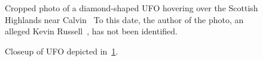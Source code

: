 %
\begin{figure}[b]
\sidecaption
%
%
\caption{Cropped photo of a diamond-shaped UFO hovering over the Scottish Highlands near Calvin~\cite{AdamsCalvin20222Aug,ClarkeCalvin22}
To this date, the author of the photo, an alleged Kevin Russell~\cite{YTDTMarch23}, has not been identified.}

\label{2023-UFO-part-History-photos-1990-calvin-c}       %
\end{figure}

%
\begin{figure}[b]
\sidecaption
%
%
\caption{Closeup of UFO depicted in~\ref{2023-UFO-part-History-photos-1990-calvin-c}.}
\label{2023-UFO-part-History-photos-1990-calvin-cu}       %
\end{figure}


